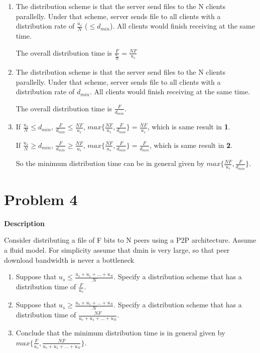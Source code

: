 \documentclass[12pt,letterpaper]{ctexart}
\begin{document}
\begin{enumerate}
  \item The distribution scheme is that the server send files to the N clients parallelly.
  Under that scheme, server sends file to all clients with a distribution rate of $\frac{u_s}{N}$ ($\leq d_{min}$).
  All clients would finish receiving at the same time.

  The overall distribution time is $\frac{F}{\frac{u_s}{N}} = \frac{NF}{u_s}$

  \item The distribution scheme is that the server send files to the N clients parallelly.
  Under that scheme, server sends file to all clients with a distribution rate of $d_{min}$.
  All clients would finish receiving at the same time.

  The overall distribution time is $\frac{F}{d_{min}}$.

  \item If $\frac{u_s}{N} \leq d_{min}$, $\frac{F}{d_{min}} \leq \frac{NF}{u_s}$, $max \{\frac{NF}{u_s}, \frac{F}{d_{min}}\} = \frac{NF}{u_s}$, which is same result in {\bf 1}.

  If $\frac{u_s}{N} \geq d_{min}$, $\frac{F}{d_{min}} \geq \frac{NF}{u_s}$, $max \{\frac{NF}{u_s}, \frac{F}{d_{min}}\} = \frac{F}{d_{min}}$, which is same result in {\bf 2}.

  So the minimum distribution time can be in general given by $max \{\frac{NF}{u_s}, \frac{F}{d_{min}}\}$.
\end{enumerate}
\newpage

\section*{Problem 4}
{\bf Description}

Consider distributing a file of F bits to N peers using a P2P architecture. Assume a fluid model. For simplicity assume that dmin is very large, so that peer download bandwidth is never a bottleneck

\begin{enumerate}
  \item Suppose that $u_s \leq \frac{u_s + u_1 + \dots + u_N}{N}$. Specify a distribution scheme that has a distribution time of $\frac{F}{u_s}$.
  \item Suppose that $u_s \geq \frac{u_s + u_1 + \dots + u_N}{N}$. Specify a distribution scheme that has a distribution time of $\frac{NF}{u_s + u_1 + \dots + u_N}$.
  \item Conclude that the minimum distribution time is in general given by $max \{\frac{F}{u_s}, \frac{NF}{u_s + u_1 + \dots + u_N}\}$.
\end{enumerate}
\end{document}
